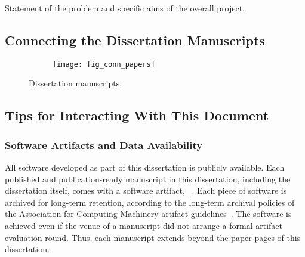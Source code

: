 Statement of the problem and specific aims of the overall project.

\subsection{Connecting the Dissertation Manuscripts}

\begin{figure}[p]
\begin{subfigure}{\textwidth}
\texttt{[image: fig\_conn\_papers]}
\end{subfigure}
\begin{center}
\end{center}
\caption{Dissertation manuscripts.}
\label{fig:conn_papers}
\end{figure}

\subsection{Tips for Interacting With This Document}
\label{subsec:tips}

\subsubsection{Software Artifacts and Data Availability}\label{subsub:sw}
All software developed as part of this dissertation is publicly available.
Each published and publication-ready manuscript in this dissertation, including the dissertation itself, comes with a software artifact, \cf~.
Each piece of software is archived for long-term retention, according to the long-term archival policies of the Association for Computing Machinery artifact guidelines~\cite{acm_badging}.
The software is achieved even if the venue of a manuscript did not arrange a formal artifact evaluation round.
Thus, each manuscript extends beyond the paper pages of this dissertation.

